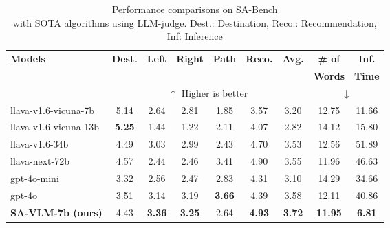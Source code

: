 \setlength{\tabcolsep}{1pt}
\begin{table}[t!]
\caption{Performance comparisons on SA-Bench \\with SOTA algorithms using LLM-judge. Dest.: Destination, Reco.: Recommendation, Inf: Inference}
\vspace{-3mm}
\centering
\begin{tabular}{|l|c|c|c|c|c||c||c|c|}
\hline
\multirow{3}{*}{\textbf{Models}} & \multirow{2}{*}{\textbf{Dest.}} & \multirow{2}{*}{\textbf{Left}}& \multirow{2}{*}{\textbf{Right}} & \multirow{2}{*}{\textbf{Path}} & \multirow{2}{*}{\textbf{Reco.}} & \multirow{2}{*}{\textbf{Avg.}} & \textbf{\# of} & \textbf{Inf.} \\
&&&&&&&\textbf{Words} & \textbf{Time}\\
\cline{2-9}
& \multicolumn{6}{c||}{\(\uparrow\) Higher is better} & \multicolumn{2}{c|}{\(\downarrow\)} \\
\hline
\hline
llava-v1.6-vicuna-7b\cite{liu2023improved} & 5.14 & 2.64 & 2.81 & 1.85 & 3.57 & 3.20 &12.75 & 11.66\\ \hline
llava-v1.6-vicuna-13b\cite{liu2023improved} & \textbf{5.25} & 1.44 & 1.22 & 2.11 & 4.07 & 2.82 &14.12 & 15.80 \\ \hline
llava-v1.6-34b\cite{liu2023improved} & 4.49 & 3.03 & 2.99 & 2.43 & 4.70 &3.53& 12.56 & 51.89 \\ \hline
llava-next-72b\cite{li2024llavanext-strong} & 4.57 & 2.44 & 2.46 & 3.41 & 4.90 &3.55& 11.96 & 46.63 \\ \hline
gpt-4o-mini\cite{openai2024gpt4technicalreport} & 3.32 & 2.56 & 2.47 & 2.83 & 4.31&3.10 & 14.29 & 34.66 \\ \hline
gpt-4o\cite{openai2024gpt4technicalreport} & 3.51 & 3.14 & 3.19 & \textbf{3.66} & 4.39 & 3.58&12.11 & 40.86 \\ \hline
\hline
\textbf{SA-VLM-7b (ours)} & 4.43 & \textbf{3.36} & \textbf{3.25} & 2.64 & \textbf{4.93}&\textbf{3.72} & \textbf{11.95} & \textbf{6.81} \\ 
\hline
\end{tabular}
\label{tab:comparison}
\vspace{-8pt}
\end{table}


